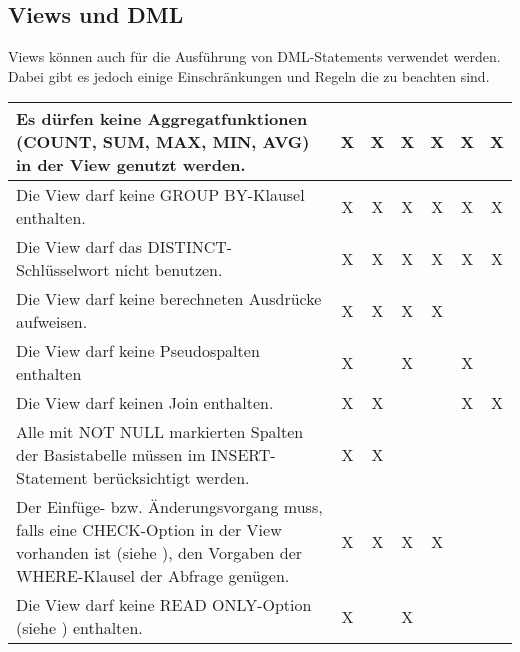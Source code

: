       \subsection{Views und DML}
        Views können  auch für die Ausführung von DML-Statements verwendet werden. Dabei gibt es jedoch einige Einschränkungen und Regeln die zu beachten sind.
        \begin{center}
          \label{rulesdmlviews}
          \begin{small}
            \tabletail{
              \hline
            }
            \tablelasttail {
              \hline
            }
            \begin{supertabular}{|p{8.5cm}|c|c|c|c|c|c|}
              Es dürfen keine Aggregatfunktionen (COUNT, SUM, MAX, MIN, AVG) in der View genutzt werden. & X & X & X & X & X & X \\
              \hline
              Die View darf keine GROUP BY-Klausel enthalten. & X & X & X & X & X & X \\
              \hline
              Die View darf das DISTINCT-Schlüsselwort nicht benutzen. & X & X & X & X & X & X\\
              \hline
              Die View darf keine berechneten Ausdrücke aufweisen. & X & X & X & X & & \\
              \hline
              Die View darf keine Pseudospalten enthalten & X & & X & & X & \\
              \hline
              Die View darf keinen Join enthalten. & X & X & & & X & X \\
              \hline
              Alle mit NOT NULL markierten Spalten der Basistabelle müssen im INSERT-Statement berücksichtigt werden. & X & X & & & & \\
              \hline
              Der Einfüge- bzw. Änderungsvorgang muss, falls eine CHECK-Option in der View vorhanden ist (siehe ), den Vorgaben der WHERE-Klausel der Abfrage genügen. & X & X & X & X & & \\
              \hline
              Die View darf keine READ ONLY-Option (siehe ) enthalten. & X & & X & & &\\
            \end{supertabular}
          \end{small}
        \end{center}
